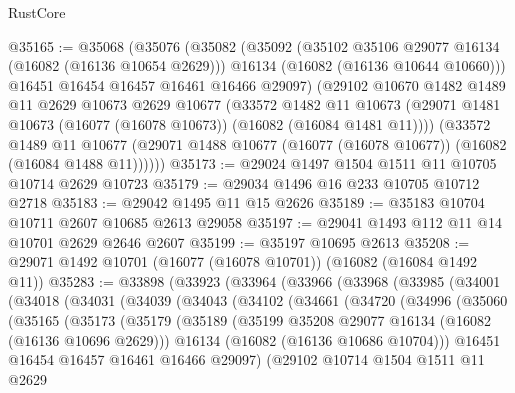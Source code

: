 \begin{lexlean}{RustCore}
\begin{coremodule}
@35165 := @35068
    (@35076
      (@35082
        (@35092
          (@35102 @35106 @29077 @16134 (@16082 (@16136 @10654 @2629)))
          @16134
          (@16082 (@16136 @10644 @10660)))
        @16451
        @16454
        @16457
        @16461
        @16466
        @29097)
      (@29102
        @10670
        @1482
        @1489
        @11
        @2629
        @10673
        @2629
        @10677
        (@33572
          @1482
          @11
          @10673
          (@29071 @1481 @10673 (@16077 (@16078 @10673)) (@16082 (@16084 @1481 @11))))
        (@33572
          @1489
          @11
          @10677
          (@29071 @1488 @10677 (@16077 (@16078 @10677)) (@16082 (@16084 @1488 @11))))))
@35173 := @29024 @1497 @1504 @1511 @11 @10705 @10714 @2629 @10723
@35179 := @29034 @1496 @16 @233 @10705 @10712 @2718
@35183 := @29042 @1495 @11 @15 @2626
@35189 := @35183 @10704 @10711 @2607 @10685 @2613 @29058
@35197 := @29041 @1493 @112 @11 @14 @10701 @2629 @2646 @2607
@35199 := @35197 @10695 @2613
@35208 := @29071 @1492 @10701 (@16077 (@16078 @10701)) (@16082 (@16084 @1492 @11))
@35283 := @33898
    (@33923
      (@33964
        (@33966
          (@33968
            (@33985
              (@34001
                (@34018
                  (@34031
                    (@34039
                      (@34043
                        (@34102
                          (@34661
                            (@34720
                              (@34996
                                (@35060
                                  (@35165
                                    (@35173
                                      (@35179
                                        (@35189
                                          (@35199
                                            @35208
                                            @29077
                                            @16134
                                            (@16082 (@16136 @10696 @2629)))
                                          @16134
                                          (@16082 (@16136 @10686 @10704)))
                                        @16451
                                        @16454
                                        @16457
                                        @16461
                                        @16466
                                        @29097)
                                      (@29102
                                        @10714
                                        @1504
                                        @1511
                                        @11
                                        @2629

\end{coremodule}
\end{lexlean}
